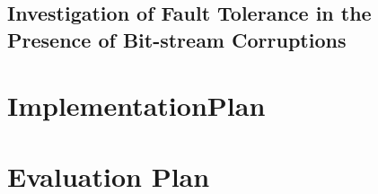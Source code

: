 \documentclass[11pt]{article}
\begin{document}
\subsection{Investigation of Fault Tolerance in the Presence of Bit-stream Corruptions}
\label{sec:InvestigationOfFaultToleranceInThePresenceOfBitstreamCorruptions}

\section{ImplementationPlan}
\label{sec:ImplementationPlan}

\section{Evaluation Plan}
\label{sec:EvaluationPlan}






\nocite{*}
\end{document}
